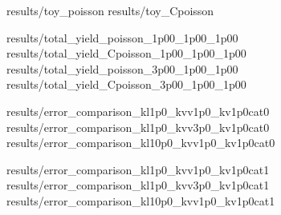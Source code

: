 {results/toy_poisson}
{results/toy_Cpoisson}

{results/total_yield_poisson_1p00_1p00_1p00}
{results/total_yield_Cpoisson_1p00_1p00_1p00}
{results/total_yield_poisson_3p00_1p00_1p00}
{results/total_yield_Cpoisson_3p00_1p00_1p00}

{results/error_comparison_kl1p0_kvv1p0_kv1p0cat0}
{results/error_comparison_kl1p0_kvv3p0_kv1p0cat0}
{results/error_comparison_kl10p0_kvv1p0_kv1p0cat0}

{results/error_comparison_kl1p0_kvv1p0_kv1p0cat1}
{results/error_comparison_kl1p0_kvv3p0_kv1p0cat1}
{results/error_comparison_kl10p0_kvv1p0_kv1p0cat1}



